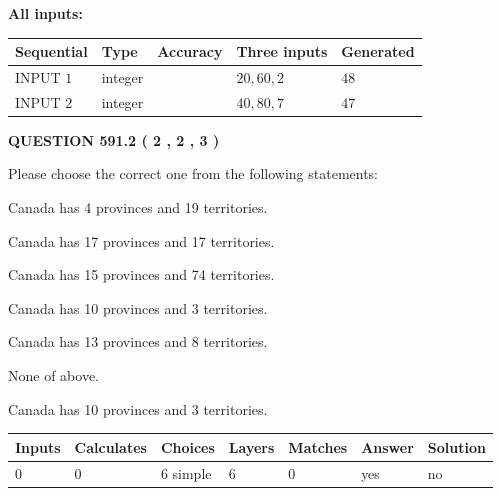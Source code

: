 \documentclass[12pt]{article}
\begin{document}
   
   
   
\noindent\vspace{0.1in}\hspace{-0.08in} {\textbf{\Large{All inputs: }}}
   
   
  
  
\noindent\begin{tabular}{|l|l|l|l|l|}
\hline
 Sequential & Type & Accuracy & Three inputs & Generated \\ 
\hline
 
 
  INPUT $  1 $ & integer &  & $
 20
 , 
 60
 , 
 2
 $ & $ 48 $ 
 \\  \hline  
 
 
  INPUT $  2 $ & integer &  & $
 40
 , 
 80
 , 
 7
 $ & $ 47 $ 
 \\  \hline  
 \end{tabular}
   
   
  
\vspace{0.2in}
  
{\textbf{\Large{QUESTION
591.2 
 ( 2 , 2 , 3 )
}}}
  
  
Please choose the correct one from the following statements:
 
 
Canada has   4 provinces and  19 territories.
 
 
Canada has  17 provinces and  17 territories.
 
 
Canada has  15 provinces and  74 territories.
 
 
Canada has 10  provinces and 3 territories.
 
 
Canada has  13 provinces and  8 territories.
 
 
 None of above.
 
 
\noindent{}
 
 
Canada has 10  provinces and 3 territories.
 
 
\noindent{}
 
 
   
   
   
   
\noindent\begin{tabular}{|l|l|l|l|l|l|l|}
 \hline
Inputs & Calculates & Choices & Layers & Matches & Answer & Solution \\ \hline
 0  & 
 0  & 
 6
  simple  
  & 
 6  & 
 0  & 
  yes & 
  no 
  \\ \hline
 \end{tabular}
   
\end{document}
